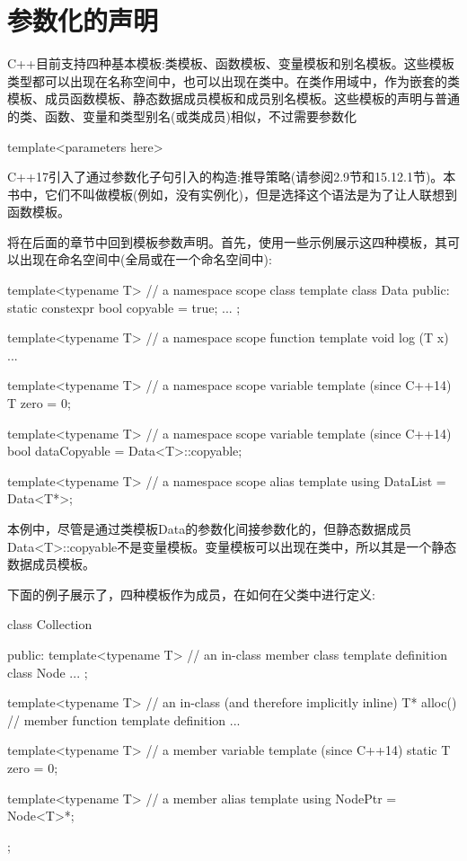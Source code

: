\section{参数化的声明}

C++目前支持四种基本模板:类模板、函数模板、变量模板和别名模板。这些模板类型都可以出现在名称空间中，也可以出现在类中。在类作用域中，作为嵌套的类模板、成员函数模板、静态数据成员模板和成员别名模板。这些模板的声明与普通的类、函数、变量和类型别名(或类成员)相似，不过需要参数化

\begin{cpp}
template<parameters here>
\end{cpp}

C++17引入了通过参数化子句引入的构造:推导策略(请参阅2.9节和15.12.1节)。本书中，它们不叫做模板(例如，没有实例化)，但是选择这个语法是为了让人联想到函数模板。

将在后面的章节中回到模板参数声明。首先，使用一些示例展示这四种模板，其可以出现在命名空间中(全局或在一个命名空间中):

\begin{cpp}
template<typename T> // a namespace scope class template
class Data {
	public:
	static constexpr bool copyable = true;
	...
};

template<typename T> // a namespace scope function template
void log (T x) {
	...
}

template<typename T> // a namespace scope variable template (since C++14)
T zero = 0;

template<typename T> // a namespace scope variable template (since C++14)
bool dataCopyable = Data<T>::copyable;

template<typename T> // a namespace scope alias template
using DataList = Data<T*>;
\end{cpp}

本例中，尽管是通过类模板Data的参数化间接参数化的，但静态数据成员Data<T>::copyable不是变量模板。变量模板可以出现在类中，所以其是一个静态数据成员模板。

下面的例子展示了，四种模板作为成员，在如何在父类中进行定义:

\begin{cpp}
class Collection {
	public:
	template<typename T> // an in-class member class template definition
	class Node {
		...
	};

	template<typename T> // an in-class (and therefore implicitly inline)
	T* alloc() { // member function template definition
		...
	}

	template<typename T> // a member variable template (since C++14)
	static T zero = 0;
	
	template<typename T> // a member alias template
	using NodePtr = Node<T>*;
};
\end{cpp}

